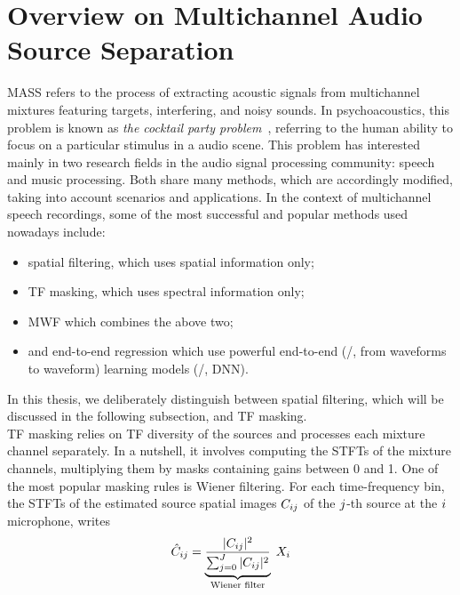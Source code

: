 \section{Overview on Multichannel Audio Source Separation}\label{sec:application:separation}
\acf{MASS} refers to the process of extracting acoustic signals from multichannel mixtures featuring targets, interfering, and noisy sounds.
In psychoacoustics, this problem is known as \textit{the cocktail party problem}~, referring to the human ability to focus on a particular stimulus in a audio scene.
This problem has interested mainly in two research fields in the audio signal processing community: speech and music processing.
Both share many methods, which are accordingly modified, taking into account scenarios and applications.
In the context of multichannel speech recordings, some of the most successful and popular methods used nowadays
include:
\begin{itemize}
    \item spatial filtering, which uses spatial information only;
    \item \ac{TF} masking, which uses spectral information only;
    \item \ac{MWF} which combines the above two;
    \item and end-to-end regression which use powerful end-to-end (\ie/, from waveforms to waveform) learning models (\eg/, \ac{DNN}).
\end{itemize}
In this thesis, we deliberately distinguish between spatial filtering, which will be discussed in the following subsection, and \ac{TF} masking.
\\\ac{TF} masking relies on \ac{TF} diversity of the sources and processes each mixture channel separately.
In a nutshell, it involves computing the \acp{STFT} of the mixture channels, multiplying them by masks containing gains between 0 and 1.
One of the most popular masking rules is Wiener filtering.
For each time-frequency bin, the \acp{STFT} of the estimated source spatial images $C_{ij}$ of the $j$-th source at the $i$ microphone, writes
\begin{equation}
        \hat{C}_{ij} = \underbrace{\frac{|{C_{ij}}|^2}
                                        {\sum_{j=0}^{J} |{C_{ij}}|^2}}
                                        _{\text{Wiener filter}} \; X_{i}
\end{equation}
